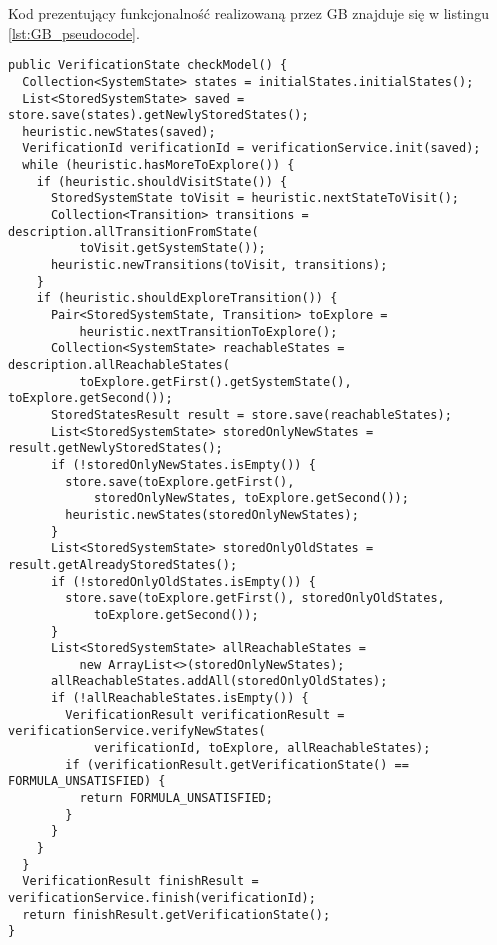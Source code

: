 Kod prezentujący funkcjonalność realizowaną przez GB znajduje się w listingu \ref{lst:GB_pseudocode}.

\begin{minipage}{\linewidth}
\begin{lstlisting}[caption={Kod algorytmu realizowanego przez GB w języku Java.},captionpos=b,label={lst:GB_pseudocode}]
public VerificationState checkModel() {
  Collection<SystemState> states = initialStates.initialStates();
  List<StoredSystemState> saved = store.save(states).getNewlyStoredStates();
  heuristic.newStates(saved);
  VerificationId verificationId = verificationService.init(saved);
  while (heuristic.hasMoreToExplore()) {
    if (heuristic.shouldVisitState()) {
      StoredSystemState toVisit = heuristic.nextStateToVisit();
      Collection<Transition> transitions = description.allTransitionFromState(
          toVisit.getSystemState());
      heuristic.newTransitions(toVisit, transitions);
    }
    if (heuristic.shouldExploreTransition()) {
      Pair<StoredSystemState, Transition> toExplore = 
          heuristic.nextTransitionToExplore();
      Collection<SystemState> reachableStates = description.allReachableStates(
          toExplore.getFirst().getSystemState(), toExplore.getSecond());
      StoredStatesResult result = store.save(reachableStates);
      List<StoredSystemState> storedOnlyNewStates = result.getNewlyStoredStates();
      if (!storedOnlyNewStates.isEmpty()) {
        store.save(toExplore.getFirst(),
            storedOnlyNewStates, toExplore.getSecond());
        heuristic.newStates(storedOnlyNewStates);
      }
      List<StoredSystemState> storedOnlyOldStates = result.getAlreadyStoredStates();
      if (!storedOnlyOldStates.isEmpty()) {
        store.save(toExplore.getFirst(), storedOnlyOldStates,
            toExplore.getSecond());
      }
      List<StoredSystemState> allReachableStates =
          new ArrayList<>(storedOnlyNewStates);
      allReachableStates.addAll(storedOnlyOldStates);
      if (!allReachableStates.isEmpty()) {
        VerificationResult verificationResult = verificationService.verifyNewStates(
            verificationId, toExplore, allReachableStates);
        if (verificationResult.getVerificationState() == FORMULA_UNSATISFIED) {
          return FORMULA_UNSATISFIED;
        }
      }
    }
  }
  VerificationResult finishResult = verificationService.finish(verificationId);
  return finishResult.getVerificationState();
}
\end{lstlisting}
\end{minipage}


